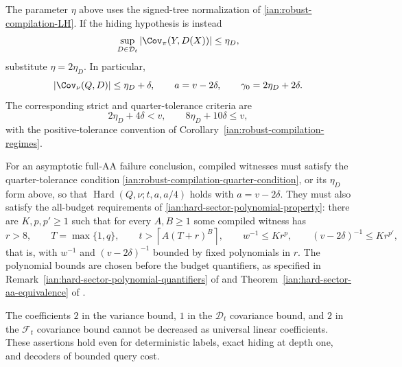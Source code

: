 \begin{remark}
\label{ian:robust-compilation-normalization}
The parameter \(\eta\) above uses the signed-tree normalization of \eqref{ian:robust-compilation-LH}.
If the hiding hypothesis is instead
\[
 \sup_{D\in\mathcal D_t}
 |\Cov_\pi(Y,D(X))|\le\eta_D,
\]
substitute \(\eta=2\eta_D\). In particular,
\[
 |\Cov_\nu(Q,D)|\le\eta_D+\delta,
 \qquad
 a=v-2\delta,\qquad
 \gamma_0=2\eta_D+2\delta.
\]
The corresponding strict and quarter-tolerance criteria are
\[
 2\eta_D+4\delta<v,
 \qquad
 8\eta_D+10\delta\le v,
\]
with the positive-tolerance convention of
Corollary~\ref{ian:robust-compilation-regimes}.

For an asymptotic full-AA failure conclusion, compiled witnesses must satisfy the quarter-tolerance condition \eqref{ian:robust-compilation-quarter-condition}, or its \(\eta_D\) form above, so that \(\operatorname{Hard}(Q,\nu;t,a,a/4)\) holds with \(a=v-2\delta\).
They must also satisfy the all-budget requirements of \eqref{ian:hard-sector-polynomial-property}: there are \(K,p,p'\ge1\) such that for every \(A,B\ge1\) some compiled witness has
\[
 r>8,
 \qquad
 T=\max\{1,q\},
 \qquad
 t>\left\lceil A(T+r)^B\right\rceil,
 \qquad
 w^{-1}\le Kr^p,
 \qquad
 (v-2\delta)^{-1}\le Kr^{p'},
\]
that is, with \(w^{-1}\) and \((v-2\delta)^{-1}\) bounded by fixed polynomials in \(r\).
The polynomial bounds are chosen before the budget quantifiers, as specified in
Remark~\ref{ian:hard-sector-polynomial-quantifiers} of
 and
Theorem~\ref{ian:hard-sector-aa-equivalence} of
.
\end{remark}

\begin{proposition}
\label{ian:robust-compilation-sharpness}
The coefficients \(2\) in the variance bound, \(1\) in the \(\mathcal D_t\) covariance bound, and \(2\) in the \(\mathcal F_t\) covariance bound cannot be decreased as universal linear coefficients.
These assertions hold even for deterministic labels, exact hiding at depth one, and decoders of bounded query cost.
\end{proposition}

